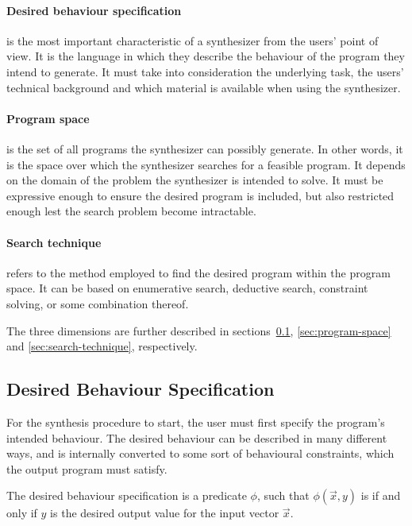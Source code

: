 \paragraph{Desired behaviour specification} is the most important characteristic of a synthesizer from the users' point of view. It is the language in which they describe the behaviour of the program they intend to generate. It must take into consideration the underlying task, the users' technical background and which material is available when using the synthesizer.

\paragraph{Program space} is the set of all programs the synthesizer can possibly generate. In other words, it is the space over which the synthesizer searches for a feasible program. It depends on the domain of the problem the synthesizer is intended to solve. It must be expressive enough to ensure the desired program is included, but also restricted enough lest the search problem become intractable.

\paragraph{Search technique} refers to the method employed to find the desired program within the program space. It can be based on enumerative search, deductive search, constraint solving, or some combination thereof.

\medskip

\noindent
The three dimensions are further described in sections~\ref{sec:desired-behaviour-spec}, \ref{sec:program-space} and \ref{sec:search-technique}, respectively.

\subsection{Desired Behaviour Specification} \label{sec:desired-behaviour-spec}
For the synthesis procedure to start, the user must first specify the program's intended behaviour. The desired behaviour can be described in many different ways, and is internally converted to some sort of behavioural constraints, which the output program must satisfy.

\begin{definition}
The desired behaviour specification is a predicate \(\phi\), such that \(\phi(\vec{x}, y)\) is \true{} if and only if \(y\) is the desired output value for the input vector \(\vec{x}\).
\end{definition}


